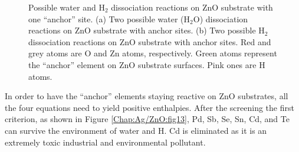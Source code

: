 \newpage
\begingroup
\begin{figure}[!ht]
  \centering
  \label{Chap:Ag/ZnO:fig:12a}
  \label{Chap:Ag/ZnO:fig:12b}
\caption[Possible water and $\text{H}_{\text{2}}$ dissociation reactions on ZnO substrate with ``anchor'' sites.]{Possible water and $\text{H}_{\text{2}}$ dissociation reactions on ZnO substrate with one ``anchor'' site. (a) Two possible water ($\text{H}_{\text{2}}\text{O}$) dissociation reactions on ZnO substrate with anchor sites. (b) Two possible $\text{H}_{\text{2}}$ dissociation reactions on ZnO substrate with anchor sites. Red and grey atoms are O and Zn atoms, respectively. Green atoms represent the ``anchor'' element on ZnO substrate surfaces. Pink ones are H atoms.}
\label{Chap:Ag/ZnO:fig12}
\end{figure}
\endgroup

In order to have the ``anchor'' elements staying reactive on ZnO substrates, all the four equations need to yield positive enthalpies. After the screening the first criterion, as shown in Figure \ref{Chap:Ag/ZnO:fig13}, Pd, Sb, Se, Sn, Cd, and Te can survive the environment of water and H. Cd is eliminated as it is an extremely toxic industrial and environmental pollutant.

